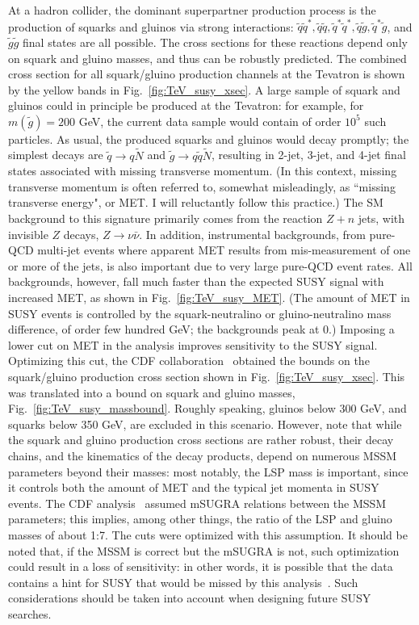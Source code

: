 \documentclass{ws-procs9x6}
\begin{document}
At a hadron collider, the dominant superpartner production process is the production of squarks and gluinos via strong interactions: $\tilde{q}\tilde{q}^*, \tilde{q}\tilde{q}, \tilde{q}^*\tilde{q}^*, \tilde{q}\tilde{g}, \tilde{q}^*\tilde{g}$, and $\tilde{g}\tilde{g}$ final states are all possible. The cross sections for these reactions depend only on squark and gluino masses, and thus can be robustly predicted. The combined cross section for all squark/gluino production channels at the Tevatron is shown by the yellow bands in Fig.~\ref{fig:TeV_susy_xsec}. A large sample of squark and gluinos could in principle be produced at the Tevatron: for example, for $m(\tilde{g})=200$ GeV, the current data sample would contain of order $10^5$ such particles. As usual, the produced squarks and gluinos would decay promptly; the simplest decays are $\tilde{q}\to q\tilde{N}$ and $\tilde{g}\to q\tilde{q}\tilde{N}$, resulting in 2-jet, 3-jet, and 4-jet final states associated with missing transverse momentum. (In this context, missing transverse momentum is often referred to, somewhat misleadingly, as ``missing transverse energy", or MET. I will reluctantly follow this practice.) The SM background to this signature primarily comes from the reaction $Z+n$ jets, with invisible $Z$ decays, $Z\to\nu\bar{\nu}$. In addition, instrumental backgrounds, from pure-QCD multi-jet events where apparent MET results from mis-measurement of one or more of the jets, is also important due to very large pure-QCD event rates. All backgrounds, however, fall much faster than the expected SUSY signal with increased MET, as shown in Fig.~\ref{fig:TeV_susy_MET}. (The amount of MET in SUSY events is controlled by the squark-neutralino or gluino-neutralino mass difference, of order few hundred GeV; the backgrounds peak at 0.) Imposing a lower cut on MET in the analysis improves sensitivity to the SUSY signal. Optimizing this cut, the CDF collaboration~\cite{TeV_susy} obtained the bounds on the squark/gluino production cross section shown in Fig.~\ref{fig:TeV_susy_xsec}. This was translated into a bound on squark and gluino masses, Fig.~\ref{fig:TeV_susy_massbound}. 
Roughly speaking, gluinos below 300 GeV, and squarks below 350 GeV, are excluded in this scenario. However, note that while the squark and gluino production cross sections are rather robust, their decay chains, and the kinematics of the decay products, depend on numerous MSSM parameters beyond their masses: most notably, the LSP mass is important, since it controls both the amount of MET and the typical jet momenta in SUSY events. The CDF analysis~\cite{TeV_susy} assumed mSUGRA relations between the MSSM parameters; this implies, among other things, the ratio of the LSP and gluino masses of about 1:7. The cuts were optimized with this assumption. It should be noted that, if the MSSM is correct but the mSUGRA is not, such optimization could result in a loss of sensitivity: in other words, it is possible that the data contains a hint for SUSY that would be missed by this analysis~\cite{Jay}. Such considerations should be taken into account when designing future SUSY searches.
\end{document}

